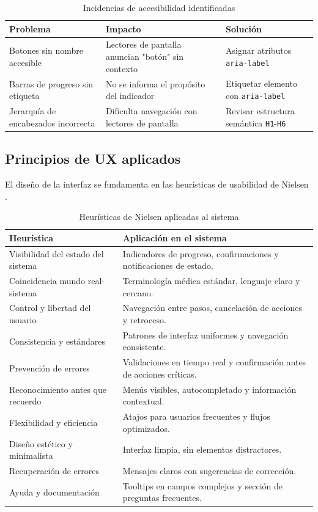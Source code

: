 \documentclass[12pt,letterpaper]{article}
\begin{document}
\begin{table}[H]
\centering
\caption{Incidencias de accesibilidad identificadas}
\label{tab:incidencias-accesibilidad}
\begin{tabular}{|p{4cm}|p{4cm}|p{5cm}|}
\hline
\textbf{Problema} & \textbf{Impacto} & \textbf{Solución} \\ \hline
Botones sin nombre accesible & Lectores de pantalla anuncian "botón" sin contexto & Asignar atributos \texttt{aria-label} \\ \hline
Barras de progreso sin etiqueta & No se informa el propósito del indicador & Etiquetar elemento con \texttt{aria-label} \\ \hline
Jerarquía de encabezados incorrecta & Dificulta navegación con lectores de pantalla & Revisar estructura semántica \texttt{H1}-\texttt{H6} \\ \hline
\end{tabular}
\end{table}

\subsection{Principios de UX aplicados}

El diseño de la interfaz se fundamenta en las heurísticas de usabilidad de Nielsen \cite{nielsen1994}.

\begin{table}[H]
\centering
\caption{Heurísticas de Nielsen aplicadas al sistema}
\label{tab:heurísticas}
\begin{tabular}{|p{3.2cm}|p{9.8cm}|}
\hline
\textbf{Heurística} & \textbf{Aplicación en el sistema} \\ \hline
Visibilidad del estado del sistema & Indicadores de progreso, confirmaciones y notificaciones de estado. \\ \hline
Coincidencia mundo real-sistema & Terminología médica estándar, lenguaje claro y cercano. \\ \hline
Control y libertad del usuario & Navegación entre pasos, cancelación de acciones y retroceso. \\ \hline
Consistencia y estándares & Patrones de interfaz uniformes y navegación consistente. \\ \hline
Prevención de errores & Validaciones en tiempo real y confirmación antes de acciones críticas. \\ \hline
Reconocimiento antes que recuerdo & Menús visibles, autocompletado y información contextual. \\ \hline
Flexibilidad y eficiencia & Atajos para usuarios frecuentes y flujos optimizados. \\ \hline
Diseño estético y minimalista & Interfaz limpia, sin elementos distractores. \\ \hline
Recuperación de errores & Mensajes claros con sugerencias de corrección. \\ \hline
Ayuda y documentación & Tooltips en campos complejos y sección de preguntas frecuentes. \\ \hline
\end{tabular}
\end{table}
\end{document}
